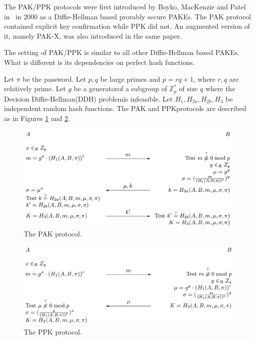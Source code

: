 

The PAK/PPK protocols were first introduced by Boyko, MacKenzie and Patel in~\cite{BoMaPa00} in 2000
as a Diffie-Hellman based provably secure PAKEs. The PAK protocol contained explicit key confirmation
while PPK did not. An augmented version of it, namely PAK-X, was also introduced in the same paper.

The setting of PAK/PPK is similar to all other Diffie-Hellman based PAKEs. What is different is its dependencies on perfect hash functions.

Let $\pi$ be the password. Let $p, q$ be large primes and $p = rq+1$, where $r, q$ are relatively prime.
Let $g$ be a generatorof a subgroup of $\mathbb{Z}^\ast_p$ of size $q$ where the Decision
 Diffie-Hellman(DDH) problemis infeasible. Let $H_1, H_{2a}, H_{2b}, H_3$ be independent random hash 
functions. The PAK and PPKprotocols are described as in Figures \ref{fig:pak} and \ref{fig:ppk}. 

\begin{figure}[h]
    \centering
    \label{fig:pak}
    \includegraphics[scale=0.4]{pak_protocol.png}
    \caption{The PAK protocol.}
\end{figure}

\begin{figure}[h]
    \centering
    \label{fig:ppk}
    \includegraphics[scale=0.33]{ppk_protocol.png}
    \caption{The PPK protocol.}
\end{figure}

